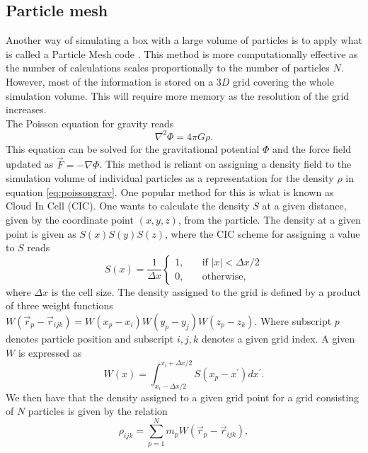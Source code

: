 \subsection{Particle mesh}
Another way of simulating a box with a large volume of particles is to apply
what is called a Particle Mesh code \cite{HockneyRW1981Csup} \cite{Fazio2309855}. This method is more computationally
effective as the number of calculations scales proportionally to the number of particles $N$. However, most of
the information is stored on a $3D$ grid covering the whole simulation volume.
This will require more memory as the resolution of the grid increases.\\\indent
The Poisson equation for gravity reads
\begin{equation}\label{eq:poissongrav}
    \nabla^2\Phi=4\pi G\rho.
\end{equation}
This equation can be solved for the gravitational potential $\Phi$ and
the force field updated as $\vec{F}=-\nabla\Phi$. This method is reliant on assigning a
density field to the simulation volume of individual particles as a
representation for the density $\rho$ in equation \ref{eq:poissongrav}. One popular method 
for this is what is known as Cloud In Cell (CIC). One wants to calculate the density $S$ at a given
distance, given by the coordinate point $(x, y, z)$, from the particle. The density at a given point is given as
$S(x)S(y)S(z)$, where the CIC scheme for assigning a value to $S$
reads
\begin{equation}
    S(x)=\frac{1}{\Delta x}
    \begin{cases}
        1, &\quad\text{if }\vert x \vert < \Delta x/2\\
        0, &\quad\text{otherwise},
      \end{cases}
\end{equation}
where $\Delta x$ is the cell size. The density assigned to the grid is defined
by a product of three weight functions $W(\vec{r}_p -\vec{r}_{ijk}) =
W(x_p-x_i)W(y_p-y_j)W(z_p-z_k)$. Where subscript $p$ denotes particle position
and subscript $i,j,k$ denotes a given grid index. A given $W$ is expressed as
\begin{equation}
    W(x)=\int_{x_i-\Delta x/2}^{x_i+\Delta x/2} S(x_p - x^\prime)dx^\prime.
\end{equation}
We then have that the density assigned to a given grid point for a grid
consisting of $N$ particles is given by the relation
\begin{equation}
    \rho_{ijk}=\sum_{p=1}^Nm_pW(\vec{r}_p-\vec{r}_{ijk}),
\end{equation}
